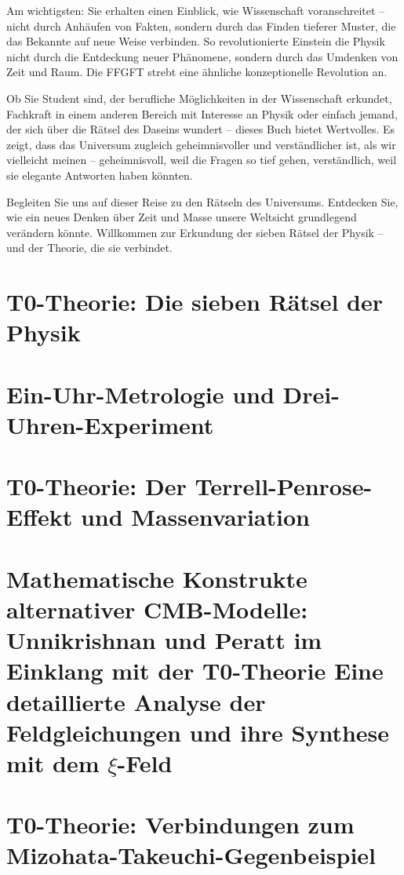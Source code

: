 \documentclass[11pt,oneside]{book}
\begin{document}
	Am wichtigsten: Sie erhalten einen Einblick, wie Wissenschaft voranschreitet – nicht durch Anhäufen von Fakten, sondern durch das Finden tieferer Muster, die das Bekannte auf neue Weise verbinden. So revolutionierte Einstein die Physik nicht durch die Entdeckung neuer Phänomene, sondern durch das Umdenken von Zeit und Raum. Die FFGFT strebt eine ähnliche konzeptionelle Revolution an.
	
	Ob Sie Student sind, der berufliche Möglichkeiten in der Wissenschaft erkundet, Fachkraft in einem anderen Bereich mit Interesse an Physik oder einfach jemand, der sich über die Rätsel des Daseins wundert – dieses Buch bietet Wertvolles. Es zeigt, dass das Universum zugleich geheimnisvoller und verständlicher ist, als wir vielleicht meinen – geheimnisvoll, weil die Fragen so tief gehen, verständlich, weil sie elegante Antworten haben könnten.
	
	Begleiten Sie uns auf dieser Reise zu den Rätseln des Universums. Entdecken Sie, wie ein neues Denken über Zeit und Masse unsere Weltsicht grundlegend verändern könnte. Willkommen zur Erkundung der sieben Rätsel der Physik – und der Theorie, die sie verbindet.
	
	\chapter{T0-Theorie: Die sieben Rätsel der Physik}
	
	
	\chapter{Ein-Uhr-Metrologie und Drei-Uhren-Experiment}
	
	
	\chapter{T0-Theorie: Der Terrell-Penrose-Effekt und Massenvariation}
	
	\chapter{Mathematische Konstrukte alternativer CMB-Modelle: Unnikrishnan und Peratt im Einklang mit der T0-Theorie Eine detaillierte Analyse der Feldgleichungen und ihre Synthese mit dem $\xi$-Feld}
	
	
	\chapter{T0-Theorie: Verbindungen zum Mizohata-Takeuchi-Gegenbeispiel}
	
	
\end{document}
